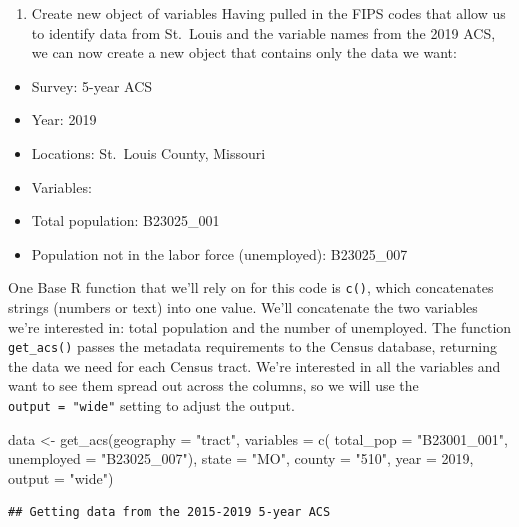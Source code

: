 \documentclass[
  krantz2]{krantz}
\makeatletter
\newenvironment{Shaded}{\begin{snugshade}}{\end{snugshade}}
\newcommand{\AttributeTok}[1]{\textcolor[rgb]{0.61,0.61,0.61}{#1}}
\newcommand{\DecValTok}[1]{\textcolor[rgb]{0.06,0.06,0.06}{#1}}
\newcommand{\FunctionTok}[1]{\textcolor[rgb]{0,0,0}{#1}}
\newcommand{\NormalTok}[1]{#1}
\newcommand{\OtherTok}[1]{\textcolor[rgb]{0.37,0.37,0.37}{#1}}
\newcommand{\StringTok}[1]{\textcolor[rgb]{0.5,0.5,0.5}{#1}}
\providecommand{\tightlist}{%
  \setlength{\itemsep}{0pt}\setlength{\parskip}{0pt}}
\newenvironment{kframe}{%
\medskip{}
\setlength{\fboxsep}{.8em}
 \def\at@end@of@kframe{}%
 \ifinner\ifhmode%
  \def\at@end@of@kframe{\end{minipage}}%
  \begin{minipage}{\columnwidth}%
 \fi\fi%
 \def\FrameCommand##1{\hskip\@totalleftmargin \hskip-\fboxsep
 \colorbox{shadecolor}{##1}\hskip-\fboxsep
     \hskip-\linewidth \hskip-\@totalleftmargin \hskip\columnwidth}%
 \MakeFramed {\advance\hsize-\width
   \@totalleftmargin\z@ \linewidth\hsize
   \@setminipage}}%
 {\par\unskip\endMakeFramed%
 \at@end@of@kframe}
\renewenvironment{Shaded}{\begin{kframe}}{\end{kframe}}
\makeatother
\begin{document}
\begin{enumerate}
\def\labelenumi{\arabic{enumi}.}
\setcounter{enumi}{1}
\tightlist
\item
  Create new object of variables
  Having pulled in the FIPS codes that allow us to identify data from St.~Louis and the variable names from the 2019 ACS, we can now create a new object that contains only the data we want:
\end{enumerate}

\begin{itemize}
\tightlist
\item
  Survey: 5-year ACS
\item
  Year: 2019
\item
  Locations: St.~Louis County, Missouri
\item
  Variables:
\item
  Total population: B23025\_001
\item
  Population not in the labor force (unemployed): B23025\_007
\end{itemize}

One Base R function that we'll rely on for this code is \texttt{c()}, which concatenates strings (numbers or text) into one value. We'll concatenate the two variables we're interested in: total population and the number of unemployed. The function \texttt{get\_acs()} passes the metadata requirements to the Census database, returning the data we need for each Census tract. We're interested in all the variables and want to see them spread out across the columns, so we will use the \texttt{output\ =\ "wide"} setting to adjust the output.

\begin{Shaded}
\begin{Highlighting}[]
\NormalTok{data }\OtherTok{\textless{}{-}} \FunctionTok{get\_acs}\NormalTok{(}\AttributeTok{geography =} \StringTok{"tract"}\NormalTok{, }\AttributeTok{variables =} \FunctionTok{c}\NormalTok{(}
  \AttributeTok{total\_pop =} \StringTok{"B23001\_001"}\NormalTok{,}
  \AttributeTok{unemployed =} \StringTok{"B23025\_007"}\NormalTok{), }\AttributeTok{state =} \StringTok{"MO"}\NormalTok{, }\AttributeTok{county =} \StringTok{"510"}\NormalTok{, }\AttributeTok{year =} \DecValTok{2019}\NormalTok{, }\AttributeTok{output =} \StringTok{"wide"}\NormalTok{)}
\end{Highlighting}
\end{Shaded}

\begin{verbatim}
## Getting data from the 2015-2019 5-year ACS
\end{verbatim}
\end{document}
